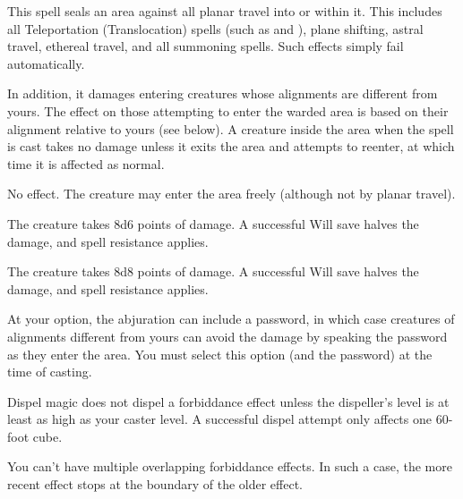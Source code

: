 \spelleffect This spell seals an area against all planar travel into or within it. This includes all Teleportation (Translocation) spells (such as  and ), plane shifting, astral travel, ethereal travel, and all summoning spells. Such effects simply fail automatically.
\par In addition, it damages entering creatures whose alignments are different from yours. The effect on those attempting to enter the warded area is based on their alignment relative to yours (see below). A creature inside the area when the spell is cast takes no damage unless it exits the area and attempts to reenter, at which time it is affected as normal.
\par {} No effect. The creature may enter the area freely (although not by planar travel).
\par {} The creature takes 8d6 points of damage. A successful Will save halves the damage, and spell resistance applies.
\par {} The creature takes 8d8 points of damage. A successful Will save halves the damage, and spell resistance applies.
\par At your option, the abjuration can include a password, in which case creatures of alignments different from yours can avoid the damage by speaking the password as they enter the area. You must select this option (and the password) at the time of casting.
\spellnotes \par Dispel magic does not dispel a forbiddance effect unless the dispeller's level is at least as high as your caster level. A successful dispel attempt only affects one 60-foot cube.
\par You can't have multiple overlapping forbiddance effects. In such a case, the more recent effect stops at the boundary of the older effect.

